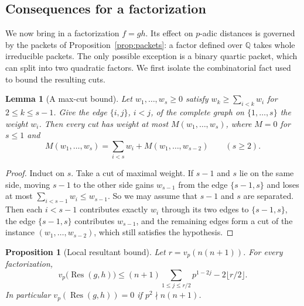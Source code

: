 \documentclass[11pt]{amsart}
\newtheorem{lemma}[theorem]{Lemma}
\newtheorem{proposition}[theorem]{Proposition}
\theoremstyle{definition}
\theoremstyle{remark}
\numberwithin{equation}{section}
\newcommand{\Q}{\mathbb{Q}}
\newcommand{\Res}{\operatorname{Res}}
\begin{document}
\subsection{Consequences for a factorization}\label{ssec:consequences}
We now bring in a factorization $f=gh$. Its effect on $p$-adic distances is
governed by the packets of Proposition~\ref{prop:packets}: a factor defined
over $\Q$ takes whole irreducible packets. The only possible exception is
a binary quartic packet, which can split into two quadratic factors.
We first isolate the combinatorial fact used to bound the resulting cuts.

\begin{lemma}[A max-cut bound]\label{lem:maxcut}
Let $w_1,\dots,w_s\ge0$ satisfy $w_k\ge\sum_{i<k}w_i$ for
$2\le k\le s-1$. Give the edge $\{i,j\}$, $i<j$, of the complete graph on
$\{1,\dots,s\}$ the weight $w_i$. Then every cut has weight at most
$M(w_1,\dots,w_s)$, where $M=0$ for $s\le1$ and
\[
 M(w_1,\dots,w_s)=\sum_{i<s}w_i+M(w_1,\dots,w_{s-2})\qquad(s\ge2).
\]
\end{lemma}

\begin{proof}
Induct on $s$. Take a cut of maximal weight. If $s-1$ and $s$ lie on the
same side, moving $s-1$ to the other side gains $w_{s-1}$ from the edge
$\{s-1,s\}$ and loses at most $\sum_{i<s-1}w_i\le w_{s-1}$. So we may
assume that $s-1$ and $s$ are separated. Then each $i<s-1$ contributes
exactly $w_i$ through its two edges to $\{s-1,s\}$, the edge $\{s-1,s\}$
contributes $w_{s-1}$, and the remaining edges form a cut of the
instance $(w_1,\dots,w_{s-2})$, which still satisfies the hypothesis.
\end{proof}

\begin{proposition}[Local resultant bound]\label{prop:localres}
Let $r=v_p(n(n+1))$. For every factorization,
\begin{equation}\label{eq:localres}
 v_p\bigl(\Res(g,h)\bigr)\le(n+1)\sum_{1\le j\le r/2}p^{1-2j}-2\lfloor r/2\rfloor .
\end{equation}
In particular $v_p(\Res(g,h))=0$ if $p^2\nmid n(n+1)$.
\end{proposition}
\end{document}
